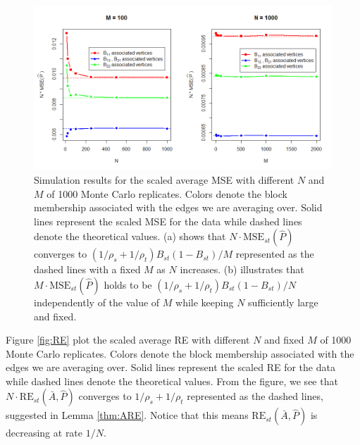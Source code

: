 \begin{figure}[!htb]
	\centering
	\includegraphics[width=16cm]{MSE.PNG}
	\caption{Simulation results for the scaled average MSE with different $N$ and $M$ of 1000 Monte Carlo replicates. Colors denote the block membership associated with the edges we are averaging over. Solid lines represent the scaled MSE for the data while dashed lines denote the theoretical values.
 (a) shows that $N \cdot \mathrm{MSE}_{st}(\hat{P})$ converges to $(1/\rho_s + 1/\rho_t) B_{st}(1-B_{st}) / M$ represented as the dashed lines with a fixed $M$ as $N$ increases.
 (b) illustrates that $M \cdot \mathrm{MSE}_{st}(\hat{P})$ holds to be $(1/\rho_s + 1/\rho_t) B_{st}(1-B_{st}) / N$ independently of the value of $M$ while keeping $N$ sufficiently large and fixed.
}
	\label{fig:MSE}
\end{figure}




Figure \ref{fig:RE} plot the scaled average RE with different $N$ and fixed $M$ of 1000 Monte Carlo replicates. Colors denote the block membership associated with the edges we are averaging over. Solid lines represent the scaled RE for the data while dashed lines denote the theoretical values. From the figure, we see that $N \cdot \mathrm{RE}_{st}(\bar{A}, \hat{P})$ converges to $1/\rho_s + 1/\rho_t$ represented as the dashed lines, suggested in Lemma \ref{thm:ARE}. Notice that this means $\mathrm{RE}_{st}(\bar{A}, \hat{P})$ is decreasing at rate $1/N$.


